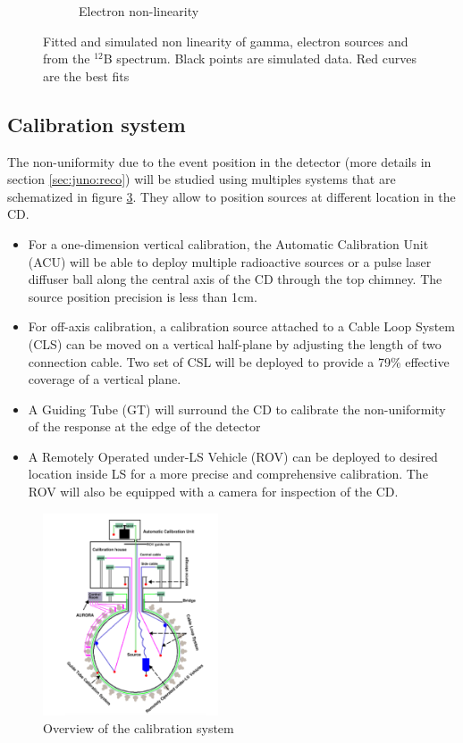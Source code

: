 \documentclass[../main.tex]{subfiles}
\begin{document}
\begin{figure}[ht]
\begin{subfigure}[b]{0.37\textwidth}
    \caption{Electron non-linearity}
    \label{fig:juno:nl:electron}
  \end{subfigure}
  \caption{Fitted and simulated non linearity of gamma, electron sources and from the $^{12}$B spectrum. Black points are simulated data. Red curves are the best fits}
  \label{fig:juno:nl}
\end{figure}

\subsection{Calibration system}

The non-uniformity due to the event position in the detector (more details in section \ref{sec:juno:reco}) will be studied using multiples systems that are schematized in figure \ref{fig:juno:calib}. They allow to position sources at different location in the CD.

\begin{itemize}
  \item For a one-dimension vertical calibration, the Automatic Calibration Unit (ACU) will be able to deploy multiple radioactive sources or a pulse laser diffuser ball along the central axis of the CD through the top chimney. The source position precision is less than 1cm.
  \item For off-axis calibration, a calibration source attached to a Cable Loop System (CLS) can be moved on a vertical half-plane by adjusting the length of two connection cable. Two set of CSL will be deployed to provide a 79\% effective coverage of a vertical plane.
  \item A Guiding Tube (GT) will surround the CD to calibrate the non-uniformity of the response at the edge of the detector
  \item A Remotely Operated under-LS Vehicle (ROV) can be deployed to desired location inside LS for a more precise and comprehensive calibration. The ROV will also be equipped with a camera for inspection of the CD.
\end{itemize}

\begin{figure}[ht]
  \centering
  \includegraphics[height=6cm]{images/juno/calib.png}
  \caption{Overview of the calibration system}
  \label{fig:juno:calib}
\end{figure}
\end{document}

